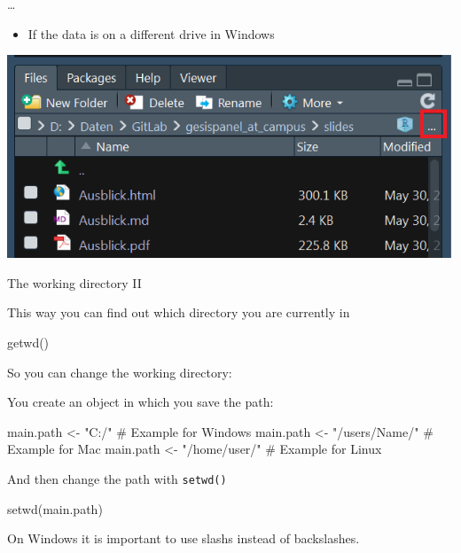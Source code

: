\documentclass[
  10pt,
  ignorenonframetext,
]{beamer}
\newenvironment{Shaded}{\begin{snugshade}}{\end{snugshade}}
\newcommand{\CommentTok}[1]{\textcolor[rgb]{0.50,0.62,0.50}{#1}}
\newcommand{\KeywordTok}[1]{\textcolor[rgb]{0.94,0.87,0.69}{#1}}
\newcommand{\NormalTok}[1]{\textcolor[rgb]{0.80,0.80,0.80}{#1}}
\newcommand{\StringTok}[1]{\textcolor[rgb]{0.80,0.58,0.58}{#1}}
\providecommand{\tightlist}{%
  \setlength{\itemsep}{0pt}\setlength{\parskip}{0pt}}
\begin{document}
\begin{frame}{\ldots{}}
\protect\hypertarget{section}{}

\begin{itemize}
\tightlist
\item
  If the data is on a different drive in Windows
\end{itemize}

\includegraphics{figure/ptptpt.PNG}

\end{frame}

\begin{frame}[fragile]{The working directory II}
\protect\hypertarget{the-working-directory-ii}{}

This way you can find out which directory you are currently in

\begin{Shaded}
\begin{Highlighting}[]
\KeywordTok{getwd}\NormalTok{()}
\end{Highlighting}
\end{Shaded}

So you can change the working directory:

You create an object in which you save the path:

\begin{Shaded}
\begin{Highlighting}[]
\NormalTok{main.path <-}\StringTok{ "C:/"} \CommentTok{# Example for Windows}
\NormalTok{main.path <-}\StringTok{ "/users/Name/"} \CommentTok{# Example for Mac}
\NormalTok{main.path <-}\StringTok{ "/home/user/"} \CommentTok{# Example for Linux}
\end{Highlighting}
\end{Shaded}

And then change the path with \texttt{setwd()}

\begin{Shaded}
\begin{Highlighting}[]
\KeywordTok{setwd}\NormalTok{(main.path)}
\end{Highlighting}
\end{Shaded}

On Windows it is important to use slashs instead of backslashes.

\end{frame}
\end{document}
